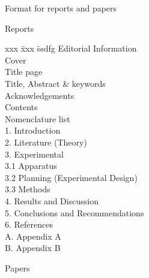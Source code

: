 \documentclass[a5paper, 10pt]{article}
\begin{document}
\begin{table}[htbp]
\begin{centering}
\caption{Format for reports and papers}
\label{tab:format}
\begin{boxedminipage}[t]{0.4\textwidth}
  \begin{centering}Reports\\\end{centering}
  \begin{spacing}{1.8}
    \begin{tabbing}
      xxx \= xxx \= ssdfg \kill
      Editorial Information                        \\
          \> Cover                                 \\
          \> Title page                            \\
          \> Title, Abstract \& keywords \\
          \> Acknowledgements                      \\
          \> Contents                              \\
          \> Nomenclature list                     \\
      1.  \> Introduction                          \\
      2.  \> Literature (Theory)                   \\
      3.  \> Experimental                          \\
      3.1 \> Apparatus                             \\
      3.2 \> Planning (Experimental Design)        \\
      3.3 \> Methods                               \\
      4.  \> Results and Discussion                \\
      5.  \> Conclusions and Recommendations       \\
      6.  \> References                            \\
      A.  \> Appendix A                            \\
      B.  \> Appendix B                            
    \end{tabbing}
  \end{spacing}
\end{boxedminipage}
\begin{boxedminipage}[t]{0.4\textwidth}
 \begin{spacing}{1.8}
  \begin{centering}Papers\\\end{centering}

\end{spacing}
\end{boxedminipage}
\end{centering}
\end{table}
\end{document}
